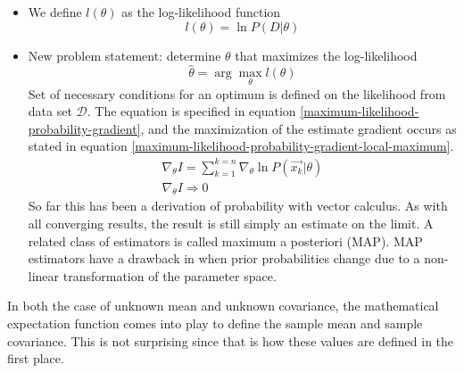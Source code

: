 \documentclass[11pt]{article}
\begin{document}
\begin{itemize}
\begin{itemize}
			\item We define $l(\theta)$ as the log-likelihood function 
			\[
			l(\theta) = \ln P(D | \theta)
			\]
			\item New problem statement: determine $\theta$ that maximizes the log-likelihood 
			\[
			\hat{\theta} = \arg \max _{\theta} l(\theta)
			\]
			Set of necessary conditions for an optimum is defined on the likelihood from data set $\mathcal{D}$.  The equation is specified in equation \ref{maximum-likelihood-probability-gradient}, and the maximization of the estimate gradient occurs as stated in equation \ref{maximum-likelihood-probability-gradient-local-maximum}.
			\begin{eqnarray}
				\nabla _{\theta} I = \sum _{k=1}^{k=n} \nabla_ {\theta} \ln P(\vec{x_k} | \theta ) \label{maximum-likelihood-probability-gradient} \\
				\nabla _{\theta} I \Rightarrow 0 \label{maximum-likelihood-probability-gradient-local-maximum}
			\end{eqnarray}
			So far this has been a derivation of probability with vector calculus.  As with all converging results, the result is still simply an estimate on the limit.  A related class of estimators is called maximum a posteriori (MAP).  MAP estimators have a drawback in when prior probabilities change due to a non-linear transformation of the parameter space.  
		\end{itemize}		
\end{itemize}

In both the case of unknown mean and unknown covariance, the mathematical expectation function comes into play to define the sample mean and sample covariance.  This is not surprising since that is how these values are defined in the first place. 
\end{document}
